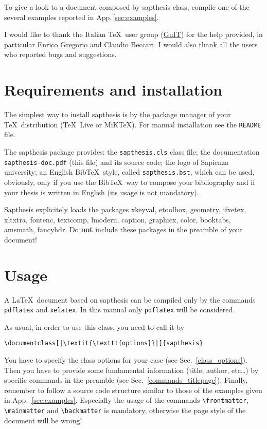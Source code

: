 \documentclass[a5paper,12pt]{article}
\newcommand{\bs}{\textbackslash}
\begin{document}
To give a look to a document composed by \textsf{sapthesis} class, compile one of the several examples reported in App.\,\ref{sec:examples}.

I would like to thank the Italian \TeX\ user group (\href{http://www.guitex.org/}{GuIT}) for the help provided, in particular Enrico Gregorio and Claudio Beccari. I would also thank all the users who reported bugs and suggestions.

\section[Requirements\\ and installation]{Requirements and installation}
\label{requirements_installation}

The simplest way to install \textsf{sapthesis} is by the package manager of 
your \TeX\ distribution (\TeX\ Live or MiK\TeX). For manual installation see 
the \texttt{README} file. 

The \textsf{sapthesis} package provides: the 
\texttt{sapthesis.cls} class file; the documentation 
\texttt{sapthesis-doc.pdf} (this file) and its source code; the logo of 
Sapienza university; an English Bib\TeX\ style, called 
\texttt{sapthesis.bst}, which can be used, obviously, only if you use the 
Bib\TeX\ way to compose your bibliography and if your thesis is written in 
English (its usage is not mandatory).


\textsf{Sapthesis} explicitely loads the packages \textsf{xkeyval}, \textsf{etoolbox}, \textsf{geometry}, \textsf{ifxetex}, \textsf{xltxtra}, \textsf{fontenc}, \textsf{textcomp}, \textsf{lmodern}, \textsf{caption}, \textsf{graphicx}, \textsf{color}, \textsf{booktabs}, \textsf{amsmath}, \textsf{fancyhdr}.
Do \textbf{not} include these packages in the preamble of your document!





\section{Usage}

A \LaTeX\ document based on \textsf{sapthesis} can be compiled only by the commands
\texttt{pdflatex} and \texttt{xelatex}. In this manual only \texttt{pdflatex} will be considered.


As usual, in order to use this class, you need to call it by
\begin{lstlisting}
\documentclass[|\textit{\texttt{options}}|]{sapthesis}
\end{lstlisting}
You have to specify the class options for your case (see Sec.~\ref{class_options}). Then you have to provide some fundamental information (title, author, etc\ldots) by specific commands in the preamble (see Sec.~\ref{commands_titlepage}). Finally, remember to follow a source code structure similar to those of the examples given in App.~\ref{sec:examples}.
Especially the usage of the commands \texttt{\bs frontmatter}, \texttt{\bs mainmatter} and \texttt{\bs backmatter} is mandatory, otherwise the page style of the document will be wrong!
\end{document}
